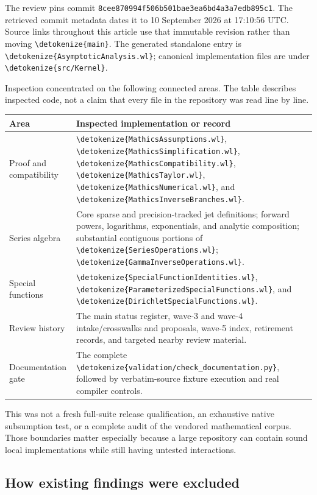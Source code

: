 \documentclass[11pt,letterpaper]{article}
\newcommand{\code}[1]{\expandafter\nolinkurl\expandafter{\detokenize{#1}}}
\newcommand{\pin}{\texttt{8cee870994f506b501bae3ea6bd4a3a7edb895c1}}
\begin{document}
The review pins commit \pin. The retrieved commit metadata dates it to 10 September 2026 at 17:10:56 UTC. Source links throughout this article use that immutable revision rather than moving \code{main}. The generated standalone entry is \code{AsymptoticAnalysis.wl}; canonical implementation files are under \code{src/Kernel}.\cite{snapshot}

Inspection concentrated on the following connected areas. The table describes inspected code, not a claim that every file in the repository was read line by line.

\begin{center}\small
\begin{tabularx}{\textwidth}{@{}p{1.27in}Y@{}}
\toprule
Area & Inspected implementation or record\\
\midrule
Proof and compatibility & \code{MathicsAssumptions.wl}, \code{MathicsSimplification.wl}, \code{MathicsCompatibility.wl}, \code{MathicsTaylor.wl}, \code{MathicsNumerical.wl}, and \code{MathicsInverseBranches.wl}.\\
Series algebra & Core sparse and precision-tracked jet definitions; forward powers, logarithms, exponentials, and analytic composition; substantial contiguous portions of \code{SeriesOperations.wl}; \code{GammaInverseOperations.wl}.\\
Special functions & \code{SpecialFunctionIdentities.wl}, \code{ParameterizedSpecialFunctions.wl}, and \code{DirichletSpecialFunctions.wl}.\\
Review history & The main status register, wave-3 and wave-4 intake/crosswalks and proposals, wave-5 index, retirement records, and targeted nearby review material.\\
Documentation gate & The complete \code{validation/check_documentation.py}, followed by verbatim-source fixture execution and real compiler controls.\\
\bottomrule
\end{tabularx}
\end{center}

This was not a fresh full-suite release qualification, an exhaustive native subsumption test, or a complete audit of the vendored mathematical corpus. Those boundaries matter especially because a large repository can contain sound local implementations while still having untested interactions.

\subsection{How existing findings were excluded}
\end{document}
